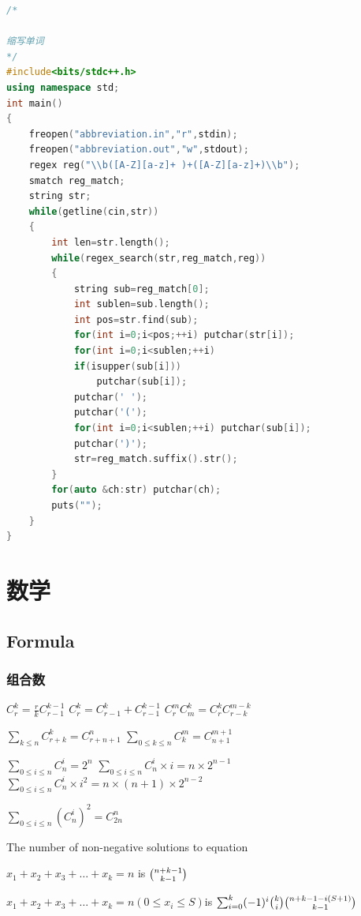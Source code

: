 \documentclass[UTF8,a4paper,titlepage]{ctexart}
\begin{document}
\begin{lstlisting}[language=C++]
/*

缩写单词
*/
#include<bits/stdc++.h>
using namespace std;
int main()
{
    freopen("abbreviation.in","r",stdin);
    freopen("abbreviation.out","w",stdout);
    regex reg("\\b([A-Z][a-z]+ )+([A-Z][a-z]+)\\b");
    smatch reg_match;
    string str;
    while(getline(cin,str))
    {
        int len=str.length();
        while(regex_search(str,reg_match,reg))
        {
            string sub=reg_match[0];
            int sublen=sub.length();
            int pos=str.find(sub);
            for(int i=0;i<pos;++i) putchar(str[i]);
            for(int i=0;i<sublen;++i)
            if(isupper(sub[i]))
                putchar(sub[i]);
            putchar(' ');
            putchar('(');
            for(int i=0;i<sublen;++i) putchar(sub[i]);
            putchar(')');
            str=reg_match.suffix().str();
        }
        for(auto &ch:str) putchar(ch);
        puts("");
    }
}

\end{lstlisting}
\section{数学}
\subsection{Formula}
\subsubsection*{组合数}
$C_r^{k}=\frac{r}{k}C_{r-1}^{k-1}$\qquad
$C_r^{k}=C_{r-1}^{k}+C_{r-1}^{k-1}$\qquad
$C_r^mC_m^k=C_r^kC_{r-k}^{m-k}$\par
$\sum_{k \le n}C_{r+k}^k=C_{r+n+1}^{n}$\qquad
$\sum_{0 \le k \le n}C_{k}^{m}=C_{n+1}^{m+1}$\par
$\sum_{0 \le i \le n}C_n^{i}=2^n$\qquad 
$\sum_{0 \le i \le n}C_n^{i}\times i =n\times 2^{n-1}$\qquad
$\sum_{0 \le i \le n}C_n^{i}\times i^2 =n\times(n+1)\times  2^{n-2}$\par 
$\sum_{0 \le i \le n}(C_n^{i})^2=C_{2n}^{n}$\par
The number of non-negative solutions to equation\par  $x_1+x_2+x_3+\dots+x_k=n$ is $\tbinom{n+k-1}{k-1}$\par
$x_1+x_2+x_3+\dots+x_k=n (0\le x_i\le S)$is  $\sum_{i=0}^{k}(-1)^i\tbinom{k}{i}\tbinom{n+k-1-i(S+1)}{k-1}$
\end{document}
